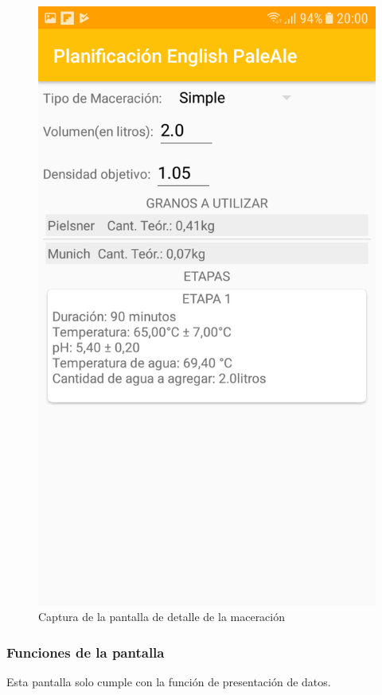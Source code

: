              \begin{figure}[h]
                    \centering
                    \includegraphics[scale=0.2]{software/ScreenCapture/MashDetailActvity.jpg}
                    \caption{Captura de la pantalla de detalle de la maceración}
                    \label{fig:CapturaDetMashAct}
                \end{figure}
            \subsubsection{Funciones de la pantalla}
                \par Esta pantalla solo cumple con la función de presentación de datos.
                
